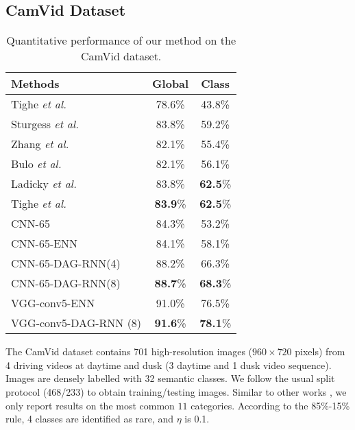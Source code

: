 \documentclass[10pt,twocolumn,letterpaper]{article}
\begin{document}
\subsection{CamVid Dataset}
\begin{table}[t]
\footnotesize
\begin{center}
\begin{tabular}{|l|cc|}
\hline
Methods & Global & Class \\
\hline
Tighe \emph{et al.}\cite{tighe2010superparsing} & 78.6\% & 43.8\% \\
Sturgess \emph{et al.}\cite{sturgess2009combining} & 83.8\% & 59.2\%\\
Zhang \emph{et al.}\cite{zhang2010semantic} & 82.1\% & 55.4\% \\
Bulo \emph{et al.}\cite{bulo2014neural} & 82.1\% & 56.1\% \\
Ladicky \emph{et al.}\cite{ladicky2010and} & 83.8\% & \textbf{62.5}\% \\
Tighe \emph{et al.} \cite{tighe2013finding} & \textbf{83.9}\% & \textbf{62.5}\% \\
\hline
CNN-65  & 84.3\% & 53.2\% \\
CNN-65-ENN & 84.1\% & 58.1\% \\
CNN-65-DAG-RNN(4) & 88.2\% & 66.3\% \\
CNN-65-DAG-RNN(8) & \textbf{88.7}\% & \textbf{68.3}\% \\
\hline
\hline
VGG-conv5-ENN & 91.0\% & 76.5\% \\
VGG-conv5-DAG-RNN (8) & \textbf{91.6}\% & \textbf{78.1}\% \\
\hline
\end{tabular}
\end{center}
\caption{Quantitative performance of our method on the CamVid dataset. }
\label{Table:result_CamVid}
\end{table}
The CamVid dataset \cite{BrostowSFC:ECCV08} contains 701 high-resolution images ($960 \times 720$ pixels) from 4 driving videos at daytime and dusk (3 daytime and 1 dusk video sequence). Images are densely labelled with 32 semantic classes. We follow the usual split protocol \cite{sturgess2009combining}\cite{tighe2013finding} (468/233) to obtain training/testing images. Similar to other works \cite{BrostowSFC:ECCV08}\cite{bulo2014neural}\cite{sturgess2009combining}\cite{tighe2013finding}, we only report results on the most common $11$ categories. According to the 85\%-15\% rule, 4 classes are identified as rare, and $\eta$ is 0.1.
\end{document}
